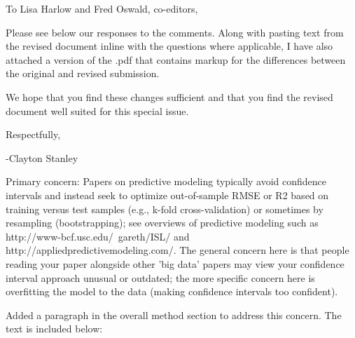 \documentclass[answers,12pt]{exam}
\begin{document}
To Lisa	Harlow and Fred	Oswald,	co-editors, \bigskip

Please see below our responses to the comments.
Along with pasting text from the revised document inline with the questions where applicable,
I have also attached a version of the .pdf that contains markup for the differences between the original and revised submission. \bigskip 

We hope that you find these changes sufficient and that you find the revised document well suited for this special issue. \bigskip

Respectfully,

-Clayton Stanley

\bigskip
\bigskip

\begin{questions}

\question Primary concern: Papers on predictive modeling typically avoid confidence intervals and instead seek to optimize out-of-sample RMSE or R2 based on training versus test samples (e.g., k-fold cross-validation) or sometimes by resampling (bootstrapping); see overviews of predictive modeling such as http://www-bcf.usc.edu/~gareth/ISL/ and http://appliedpredictivemodeling.com/.  The general concern here is that people reading your paper alongside other 'big data' papers may view your confidence interval approach unusual or outdated; the more specific concern here is overfitting the model to the data (making confidence intervals too confident).

\begin{solution}
Added a paragraph in the overall method section to address this concern.
The text is included below:


\end{solution}
\end{questions}
\end{document}
